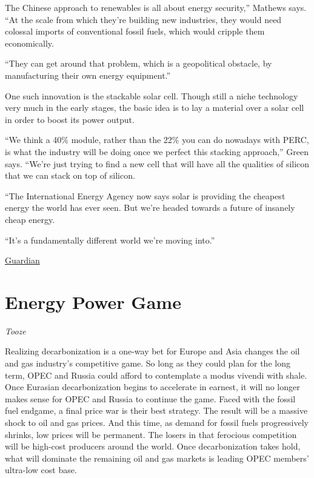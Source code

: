 \documentclass[
]{book}
\begin{document}
The Chinese approach to renewables is all about energy security,'' Mathews says. ``At the scale from which they're building new industries, they would need colossal imports of conventional fossil fuels, which would cripple them economically.

``They can get around that problem, which is a geopolitical obstacle, by manufacturing their own energy equipment.''

One such innovation is the stackable solar cell. Though still a niche technology very much in the early stages, the basic idea is to lay a material over a solar cell in order to boost its power output.

``We think a 40\% module, rather than the 22\% you can do nowadays with PERC, is what the industry will be doing once we perfect this stacking approach,'' Green says. ``We're just trying to find a new cell that will have all the qualities of silicon that we can stack on top of silicon.

``The International Energy Agency now says solar is providing the cheapest energy the world has ever seen. But we're headed towards a future of insanely cheap energy.

``It's a fundamentally different world we're moving into.''

\href{https://www.theguardian.com/australia-news/2021/apr/25/insanely-cheap-energy-how-solar-power-continues-to-shock-the-world}{Guardian}

\hypertarget{energy-power-game}{%
\section{Energy Power Game}\label{energy-power-game}}

\emph{Tooze}

Realizing decarbonization is a one-way bet for Europe and Asia changes the oil and gas industry's competitive game. So long as they could plan for the long term, OPEC and Russia could afford to contemplate a modus vivendi with shale. Once Eurasian decarbonization begins to accelerate in earnest, it will no longer makes sense for OPEC and Russia to continue the game. Faced with the fossil fuel endgame, a final price war is their best strategy. The result will be a massive shock to oil and gas prices. And this time, as demand for fossil fuels progressively shrinks, low prices will be permanent.
The losers in that ferocious competition will be high-cost producers around the world.
Once decarbonization takes hold, what will dominate the remaining oil and gas markets is leading OPEC members' ultra-low cost base.
\end{document}
